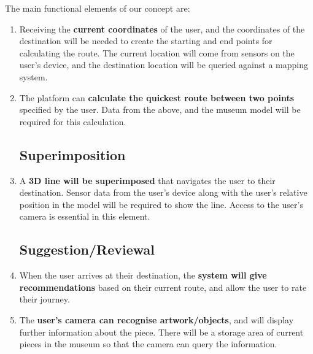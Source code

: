 
The main functional elements of our concept are:

\begin{enumerate}
\subsection*{Route Calculations}
    \item Receiving the \textbf{current coordinates} of the user, and the coordinates of the destination will be needed to create the starting and end points for calculating the route. The current location will come from sensors on the user's device, and the destination location will be queried against a mapping system.
    \item The platform can \textbf{calculate the quickest route between two points} specified by the user. Data from the above, and the museum model will be required for this calculation.

\subsection*{Superimposition}
    \item A \textbf{3D line will be superimposed} that navigates the user to their destination. Sensor data from the user's device along with the user's relative position in the model will be required to show the line. Access to the user's camera is essential in this element.

\subsection*{Suggestion/Reviewal}
    \item When the user arrives at their destination, the \textbf{system will give recommendations} based on their current route, and allow the user to rate their journey.
    \item The \textbf{user's camera can recognise artwork/objects}, and will display further information about the piece. There will be a storage area of current pieces in the museum so that the camera can query the information.
\end{enumerate}
